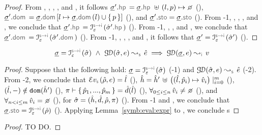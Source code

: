 \begin{proof}
 \noindent From , , , , and , it follows 
 $\istate'.\hpsel = \istate.\hpsel \dunion (\loc, p) \mapsto \none$ (), 
 $\istate'.\domsel = \istate.\domsel[\loc \mapsto \istate.\domsel(\loc) \cup \jsilset{p}]$ (), 
 and $\istate'.\stosel = \istate.\stosel$ (). 
 From \hyp{1}, ,  , , and , we conclude that $\istate'.\hpsel = \interpret{\symbinst}{\senv}(\sstate'.\hpsel)$ (). 
 From \hyp{1}, , , and , we conclude that $\istate'.\domsel =  \interpret{\symbinst}{\senv}(\sstate'.\domsel)$ (). 
 From \hyp{1}, , , , and , it follows that $\istate' = \interpret{\symbinst}{\senv}(\sstate')$ (). 
 \end{proof}


\begin{lemma}
$$
\istate = \interpret{\symbinst}{\senv}(\sstate) \ \wedge \ 
  \absgetdomainrule{\symbolic}{\sstate, \jsilexpr}{\sexpr}  
  \implies \absgetdomainrule{\instrumented}{\istate, \jsilexpr}{\val}
$$
\end{lemma}
\begin{proof}
Suppose that the following hold: 
$\istate = \interpret{\symbinst}{\senv}(\sstate)$ (\hyp{1}) and $\absgetdomainrule{\symbolic}{\sstate, \jsilexpr}{\sexpr}$ (\hyp{2}). 
From \hyp{2}, we conclude that 
$\evalexpr{\symbolic}(\sstore, \jsilexpr) = \sloc$ (), 
$\hat{h} = \hat{h}' \, \uplus \, \big((\hat{l}, \hat{p}_i) \mapsto \hat{v}_i \big)\mid_{i = 0}^m$ (), 
$(\hat{l},-) \notin \texttt{dom} (\hat{h}')$ (\ieq{3}), 
$\pi \vdash \{ \, \hat{p}_1, ..., \hat{p}_m \, \} = \hat{d}(\hat{l})$ (), 
$\forall_{0 \leq i \leq n} \, \sexprv_i \neq \none$ (\ieq{5}), 
and $\forall_{n < i \leq m} \, \sexprv_i = \none$ (), for $\hat{\sigma} = (\hat{h}, \hat{d}, \hat\rho, \pi)$ (). 
From \hyp{1} and \ieq{7}, we conclude that $\istate.\stosel = \interpret{\symbinst}{\senv}(\sstore)$ (\ieq{8}). 
 Applying Lemma~\ref{symb:eval:expr} to \ieq{1}, we conclude s
\end{proof}


\begin{temax}

\end{temax}
\begin{proof}
TO DO. 
\end{proof}

